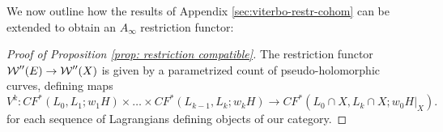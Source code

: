 \documentclass{article}
\theoremstyle{plain}%
\theoremstyle{definition}
\numberwithin{equation}{section}
\numberwithin{figure}{section}
\def\l{\label}
\def\cF{{\mathbin{\cal F}}}
\def\cW{{\mathbin{\cal W}}}
\def\iy{\infty}
\begin{document}
  
We now outline how the results of Appendix \ref{sec:viterbo-restr-cohom} can be extended to obtain an $A_\infty$ restriction functor:
\begin{proof}[Proof of Proposition \ref{prop: restriction compatible}]



  The restriction functor $\cW''(E)\to\cW''(X)$ is given by a parametrized count of pseudo-holomorphic curves, defining maps
 \begin{equation}\l{Vit1}
    V^k:  CF^*(L_0,L_1;w_1H)\times \dots \times CF^*(L_{k-1},L_k;w_kH)   \to    CF^*(L_0\cap X, L_k\cap X;w_0H|_X).
    \end{equation}
for each sequence of Lagrangians defining objects of our category.


\end{proof}
\end{document}
